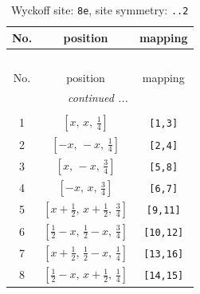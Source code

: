 \documentclass[fleqn,8pt]{jsarticle}
\begin{document}
\renewcommand{\arraystretch}{1.2}
\begin{longtable}{ccc}
\caption{Wyckoff site: {\tt 8e}, site symmetry: {\tt ..2}}
 \\
 \hline \hline
No. & position & mapping \\ \hline \endfirsthead

\multicolumn{2}{l}{\tablename\ \thetable{}} \\
 \hline \hline
No. & position & mapping \\ \hline \endhead

 \hline \hline
\multicolumn{2}{r}{\footnotesize\it continued ...} \\ \endfoot

 \hline \hline
\multicolumn{2}{r}{} \\ \endlastfoot

1 & $\left[ x,\, x,\, \frac{1}{4} \right]$ & {\tt [1,3]} \\ \hline
2 & $\left[ - x,\, - x,\, \frac{1}{4} \right]$ & {\tt [2,4]} \\ \hline
3 & $\left[ x,\, - x,\, \frac{3}{4} \right]$ & {\tt [5,8]} \\ \hline
4 & $\left[ - x,\, x,\, \frac{3}{4} \right]$ & {\tt [6,7]} \\ \hline
5 & $\left[ x + \frac{1}{2},\, x + \frac{1}{2},\, \frac{3}{4} \right]$ & {\tt [9,11]} \\ \hline
6 & $\left[ \frac{1}{2} - x,\, \frac{1}{2} - x,\, \frac{3}{4} \right]$ & {\tt [10,12]} \\ \hline
7 & $\left[ x + \frac{1}{2},\, \frac{1}{2} - x,\, \frac{1}{4} \right]$ & {\tt [13,16]} \\ \hline
8 & $\left[ \frac{1}{2} - x,\, x + \frac{1}{2},\, \frac{1}{4} \right]$ & {\tt [14,15]} \\
\end{longtable}
\renewcommand{\arraystretch}{1.2}
\end{document}
